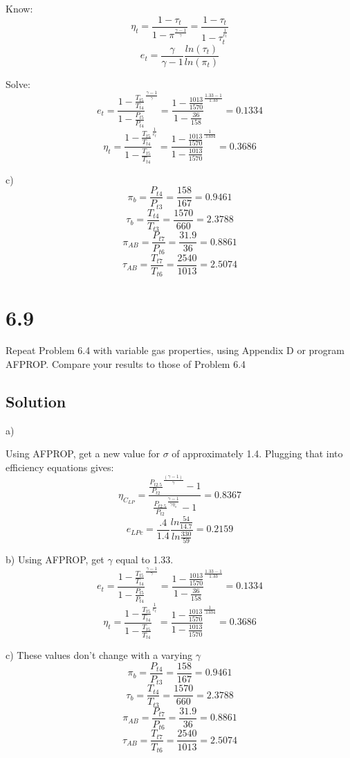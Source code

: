 \documentclass[preview,12pt]{article}
\begin{document}
	Know: 
	$$\eta_t=\frac{1-\tau_t}{1-\pi^\frac{\gamma-1}{\gamma}}=\frac{1-\tau_t}{1-\tau_t^{\frac{1}{e_t}}}$$
	$$e_t=\frac{\gamma}{\gamma-1}\frac{ln(\tau_t)}{ln(\pi_t)}$$
	
	Solve:
	$$e_t=\frac{1-\frac{T_{t5}}{T_{t4}}}{1-\frac{P_{t5}}{P_{t4}}}^\frac{\gamma-1}{\gamma}=\frac{1-\frac{1013}{1570}}{1-\frac{36}{158}}^\frac{1.33-1}{1.33}=\boxed{0.1334}$$
	$$\eta_t=\frac{1-\frac{T_{t5}}{T_{t4}}}{1-\frac{T_{t5}}{T_{t4}}}^{\frac{1}{e_t}}=\frac{1-\frac{1013}{1570}}{1-\frac{1013}{1570}}^{\frac{1}{.1334}}=\boxed{0.3686}$$
	
	c)
	$$\pi_b=\frac{P_{t4}}{P_{t3}}=\frac{158}{167}=0.9461$$
	$$\tau_b=\frac{T_{t4}}{T_{t3}}=\frac{1570}{660}=2.3788$$
	$$\pi_{AB}=\frac{P_{t7}}{P_{t6}}=\frac{31.9}{36}=0.8861$$
	$$\tau_{AB}=\frac{T_{t7}}{T_{t6}}=\frac{2540}{1013}=2.5074$$
	\linebreak

\section{6.9}
Repeat Problem 6.4 with variable gas properties, using Appendix D or program AFPROP.  Compare your results to those of Problem 6.4

    \subsection{Solution}
    a)
    
    Using AFPROP, get a new value for $\sigma$ of approximately 1.4.  Plugging that into efficiency equations gives:
    $$\eta_{C_{LP}}=\frac{\frac{P_{t2.5}}{P_{t2}}^\frac{(\gamma-1)}{\gamma}-1}{\frac{P_{t2.5}}{P_{t2}}^\frac{\gamma-1}{\gamma\eta_s}-1}=\boxed{0.8367}$$
    $$e_{LPc}=\frac{.4}{1.4}\frac{ln\frac{54}{14.7}}{ln{\frac{330}{59}}}=\boxed{0.2159}$$
    
    b)
    Using AFPROP, get $\gamma$ equal to 1.33.
    $$e_t=\frac{1-\frac{T_{t5}}{T_{t4}}}{1-\frac{P_{t5}}{P_{t4}}}^\frac{\gamma-1}{\gamma}=\frac{1-\frac{1013}{1570}}{1-\frac{36}{158}}^\frac{1.33-1}{1.33}=\boxed{0.1334}$$
	$$\eta_t=\frac{1-\frac{T_{t5}}{T_{t4}}}{1-\frac{T_{t5}}{T_{t4}}}^{\frac{1}{e_t}}=\frac{1-\frac{1013}{1570}}{1-\frac{1013}{1570}}^{\frac{1}{.1334}}=\boxed{0.3686}$$
	
	c) 
	These values don't change with a varying $\gamma$
	$$\pi_b=\frac{P_{t4}}{P_{t3}}=\frac{158}{167}=0.9461$$
	$$\tau_b=\frac{T_{t4}}{T_{t3}}=\frac{1570}{660}=2.3788$$
	$$\pi_{AB}=\frac{P_{t7}}{P_{t6}}=\frac{31.9}{36}=0.8861$$
	$$\tau_{AB}=\frac{T_{t7}}{T_{t6}}=\frac{2540}{1013}=2.5074$$
    
\end{document}
